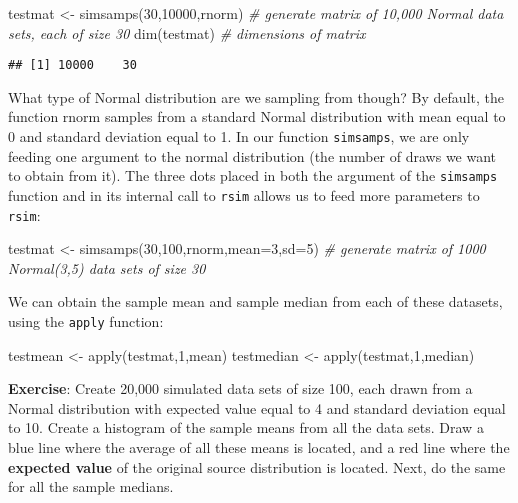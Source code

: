 \documentclass[
]{book}
\newenvironment{Shaded}{\begin{snugshade}}{\end{snugshade}}
\newcommand{\AttributeTok}[1]{\textcolor[rgb]{0.77,0.63,0.00}{#1}}
\newcommand{\CommentTok}[1]{\textcolor[rgb]{0.56,0.35,0.01}{\textit{#1}}}
\newcommand{\DecValTok}[1]{\textcolor[rgb]{0.00,0.00,0.81}{#1}}
\newcommand{\FunctionTok}[1]{\textcolor[rgb]{0.00,0.00,0.00}{#1}}
\newcommand{\NormalTok}[1]{#1}
\newcommand{\OtherTok}[1]{\textcolor[rgb]{0.56,0.35,0.01}{#1}}
\begin{document}
\begin{Shaded}
\begin{Highlighting}[]
\NormalTok{testmat }\OtherTok{\textless{}{-}} \FunctionTok{simsamps}\NormalTok{(}\DecValTok{30}\NormalTok{,}\DecValTok{10000}\NormalTok{,rnorm) }\CommentTok{\# generate matrix of 10,000 Normal data sets, each of size 30}
\FunctionTok{dim}\NormalTok{(testmat) }\CommentTok{\# dimensions of matrix}
\end{Highlighting}
\end{Shaded}

\begin{verbatim}
## [1] 10000    30
\end{verbatim}

What type of Normal distribution are we sampling from though? By default, the function rnorm samples from a standard Normal distribution with mean equal to 0 and standard deviation equal to 1. In our function \texttt{simsamps}, we are only feeding one argument to the normal distribution (the number of draws we want to obtain from it). The three dots placed in both the argument of the \texttt{simsamps} function and in its internal call to \texttt{rsim} allows us to feed more parameters to \texttt{rsim}:

\begin{Shaded}
\begin{Highlighting}[]
\NormalTok{testmat }\OtherTok{\textless{}{-}} \FunctionTok{simsamps}\NormalTok{(}\DecValTok{30}\NormalTok{,}\DecValTok{100}\NormalTok{,rnorm,}\AttributeTok{mean=}\DecValTok{3}\NormalTok{,}\AttributeTok{sd=}\DecValTok{5}\NormalTok{) }\CommentTok{\# generate matrix of 1000 Normal(3,5) data sets of size 30}
\end{Highlighting}
\end{Shaded}

We can obtain the sample mean and sample median from each of these datasets, using the \texttt{apply} function:

\begin{Shaded}
\begin{Highlighting}[]
\NormalTok{testmean }\OtherTok{\textless{}{-}} \FunctionTok{apply}\NormalTok{(testmat,}\DecValTok{1}\NormalTok{,mean)}
\NormalTok{testmedian }\OtherTok{\textless{}{-}} \FunctionTok{apply}\NormalTok{(testmat,}\DecValTok{1}\NormalTok{,median)}
\end{Highlighting}
\end{Shaded}

\textbf{Exercise}: Create 20,000 simulated data sets of size 100, each drawn from a Normal distribution with expected value equal to 4 and standard deviation equal to 10. Create a histogram of the sample means from all the data sets. Draw a blue line where the average of all these means is located, and a red line where the \textbf{expected value} of the original source distribution is located. Next, do the same for all the sample medians.
\end{document}
